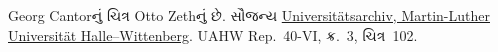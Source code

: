 Georg Cantorનું ચિત્ર Otto Zethનું છે. સૌજન્ય
\href{http://www.archiv.uni-halle.de/}{Universit\"atsarchiv,
Martin-Luther Universit\"at Halle--Wittenberg}.
UAHW Rep.~40-VI, ક્ર.~3, ચિત્ર~102.
